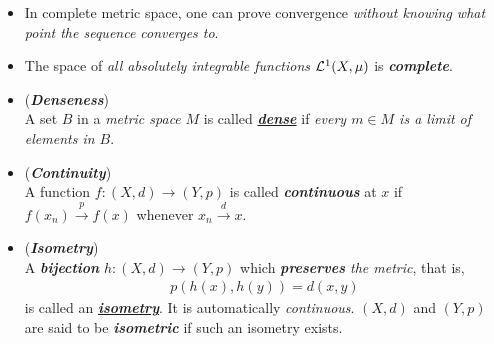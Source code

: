 \documentclass[11pt]{article}
\begin{document}
\begin{itemize}
\item \begin{remark}
In complete metric space, one can prove convergence \emph{without knowing what point the sequence converges to}.
\end{remark}

\item \begin{example}
The space of \emph{all absolutely integrable functions} ${\mathcal L}^{1}(X, \mu)$ is \emph{\textbf{complete}}.
\end{example}

\item \begin{definition}  (\emph{\textbf{Denseness}})\\
A set $B$ in a \emph{metric space} $M$ is called \underline{\emph{\textbf{dense}}} if \emph{every $m \in M$ is a limit of elements in $B$}.
\end{definition}

\item \begin{definition} (\emph{\textbf{Continuity}})\\
A function $f: (X, d) \rightarrow (Y, p)$ is called \emph{\textbf{continuous}} at $x$ if $f(x_n) \stackrel{p}{\rightarrow} f(x)$ whenever $x_n \stackrel{d}{\rightarrow} x$.
\end{definition}

\item \begin{definition}  (\emph{\textbf{Isometry}})\\
A \emph{\textbf{bijection}} $h: (X, d) \rightarrow (Y, p)$ which \emph{\textbf{preserves} the metric}, that is,
\begin{align*}
p(h(x), h(y)) = d(x, y)
\end{align*}
is called an \underline{\emph{\textbf{isometry}}}. It is automatically \emph{continuous}. $(X, d)$ and $(Y, p)$ are said to be \emph{\textbf{isometric}} if such an isometry exists.
\end{definition}
\end{itemize}
\end{document}
